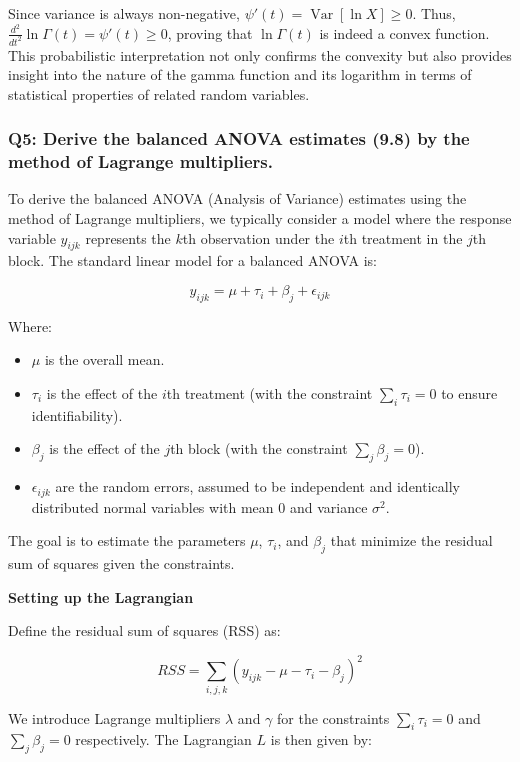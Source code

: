 \documentclass[8pt]{article}
\begin{document}
{Since variance is always non-negative, \(\psi'(t) = \operatorname{Var}[\ln X] \geq 0\). Thus, \(\frac{d^2}{dt^2} \ln \Gamma(t) = \psi'(t) \geq 0\), proving that \(\ln \Gamma(t)\) is indeed a convex function. This probabilistic interpretation not only confirms the convexity but also provides insight into the nature of the gamma function and its logarithm in terms of statistical properties of related random variables.

\subsubsection*{Q5: Derive the balanced ANOVA estimates (9.8) by the method of Lagrange multipliers.}

To derive the balanced ANOVA (Analysis of Variance) estimates using the method of Lagrange multipliers, we typically consider a model where the response variable \(y_{ijk}\) represents the \(k\)th observation under the \(i\)th treatment in the \(j\)th block. The standard linear model for a balanced ANOVA is:

\[
y_{ijk} = \mu + \tau_i + \beta_j + \epsilon_{ijk}
\]

Where:
\begin{itemize}
    \item \(\mu\) is the overall mean.
    \item \(\tau_i\) is the effect of the \(i\)th treatment (with the constraint \(\sum_i \tau_i = 0\) to ensure identifiability).
    \item \(\beta_j\) is the effect of the \(j\)th block (with the constraint \(\sum_j \beta_j = 0\)).
    \item \(\epsilon_{ijk}\) are the random errors, assumed to be independent and identically distributed normal variables with mean 0 and variance \(\sigma^2\).
\end{itemize}

The goal is to estimate the parameters \(\mu\), \(\tau_i\), and \(\beta_j\) that minimize the residual sum of squares given the constraints.

\textbf{Setting up the Lagrangian}

Define the residual sum of squares (RSS) as:

\[
RSS = \sum_{i,j,k} (y_{ijk} - \mu - \tau_i - \beta_j)^2
\]

We introduce Lagrange multipliers \(\lambda\) and \(\gamma\) for the constraints \(\sum_i \tau_i = 0\) and \(\sum_j \beta_j = 0\) respectively. The Lagrangian \(L\) is then given by:

}
\end{document}
